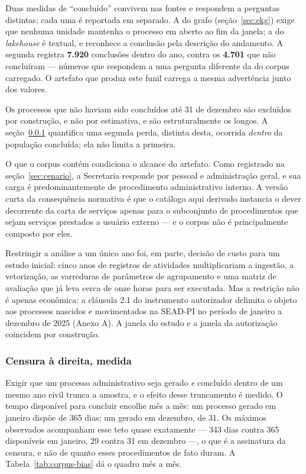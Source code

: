 Duas medidas de ``concluído'' convivem nas fontes e respondem a perguntas distintas; cada uma é
reportada em separado. A do grafo (seção~\ref{sec:ekg}) exige que nenhuma unidade mantenha o processo em
aberto ao fim da janela; a do \emph{lakehouse} é textual, e reconhece a conclusão pela descrição do
andamento. A segunda registra \textbf{7.920} conclusões dentro do ano, contra os \textbf{4.701} que
não concluíram --- números que respondem a uma pergunta diferente da do corpus carregado. O
artefato que produz este funil carrega a mesma advertência junto dos valores.

Os processos que não haviam sido concluídos até 31 de dezembro são excluídos por construção,
e não por estimativa, e são estruturalmente os longos. A seção~\ref{sec:vies} quantifica uma segunda
perda, distinta desta, ocorrida \emph{dentro} da população concluída; ela não limita a primeira.

O que o corpus contém condiciona o alcance do artefato. Como registrado na seção~\ref{sec:cenario}, a Secretaria responde por pessoal e
administração geral, e sua carga é predominantemente de procedimento administrativo interno. A
versão curta da consequência normativa é que o catálogo aqui derivado instancia o dever
decorrente da carta de serviços apenas para o subconjunto de procedimentos que sejam serviços
prestados a usuário externo --- e o corpus não é principalmente composto por eles.

Restringir a análise a um único ano foi, em parte, decisão de custo para um estudo inicial: cinco anos de registros de atividades multiplicariam a ingestão, a vetorização, as varreduras de parâmetros de
agrupamento e uma matriz de avaliação que já leva cerca de onze horas para ser executada. Mas a
restrição não é apenas econômica: a cláusula 2.1 do instrumento autorizador delimita o objeto aos
processos nascidos e movimentados na SEAD-PI no período de janeiro a dezembro de 2025 (Anexo A). A
janela do estudo e a janela da autorização coincidem por construção.

\subsubsection{Censura à direita, medida}\label{sec:vies}

Exigir que um processo administrativo seja gerado \emph{e} concluído dentro de um mesmo ano civil
trunca a amostra, e o efeito desse truncamento é medido. O tempo
disponível para concluir encolhe mês a mês: um processo gerado em janeiro dispõe de 365 dias; um gerado em dezembro, de 31. Os máximos observados acompanham esse teto quase exatamente --- 343
dias contra 365 disponíveis em janeiro, 29 contra 31 em dezembro ---, o que é a assinatura da
censura, e não de quanto esses procedimentos de fato duram. A Tabela~\ref{tab:corpus-bias} dá o
quadro mês a mês.

